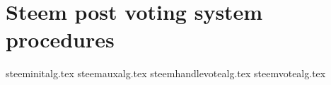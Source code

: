 \newpage
\section{Steem post voting system procedures}
  \label{appendix:procs}
  {steeminitalg.tex}
  {steemauxalg.tex}
  {steemhandlevotealg.tex}
  {steemvotealg.tex}
